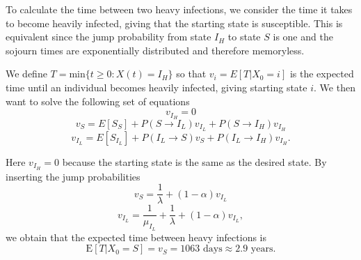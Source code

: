 To calculate the time between two heavy infections, we consider the time it takes to become heavily infected, giving that the starting state is susceptible. This is equivalent since the jump probability from state $I_H$ to state $S$ is one and the sojourn times are exponentially distributed and therefore memoryless.

We define $T = \text{min}\{t \geq 0 : X(t)=I_H\}$ so that $v_i = E\left[T|X_0 = i \right]$ is the expected time until an individual becomes heavily infected, giving starting state $i$. We then want to solve the following set of equations 
$$v_{I_H} = 0$$
$$v_{S} = E[S_S] + P(S \rightarrow I_L) v_{I_L}+ P(S \rightarrow I_H) v_{I_H} $$
$$v_{I_L} = E[S_{I_L}] + P(I_L \rightarrow S) v_S + P(I_L \rightarrow I_H) v_{I_H}. $$

Here $v_{I_H} = 0$ because the starting state is the same as the desired state. By inserting the jump probabilities 
$$ v_{S} = \frac{1}{\lambda} + (1-\alpha) v_{I_L} $$
$$ v_{I_L} =  \frac{1}{\mu_{I_L}}+  \frac{1}{\lambda} + (1-\alpha) v_{I_L}, $$
 we obtain that the expected time between heavy infections is
$$\text{E}\left[T|X_0=S \right] = v_S = 1063 \text{ days} \approx 2.9 \text{ years}.$$ 